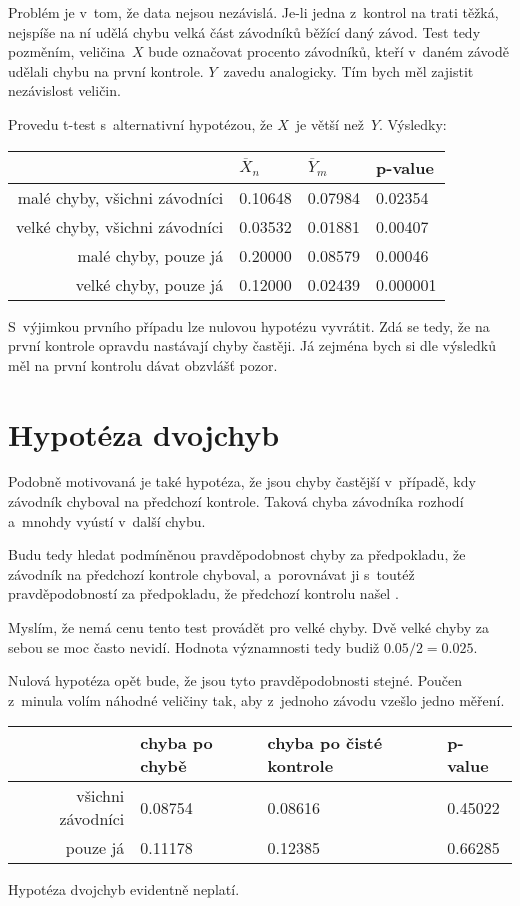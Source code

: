 \documentclass[a4paper,11pt]{article}
\begin{document}
Problém je v~tom, že data nejsou nezávislá. Je-li jedna z~kontrol na trati
těžká, nejspíše na ní udělá chybu velká část závodníků běžící daný závod. Test
tedy pozměním, veličina~$X$ bude označovat procento závodníků, kteří v~daném
závodě udělali chybu na první kontrole. $Y$~zavedu analogicky. Tím bych měl
zajistit nezávislost veličin.

Provedu t-test s~alternativní hypotézou, že $X$~je větší než~$Y$. Výsledky:

\begin{tabular}{r | l | l | l}
     & $\overline{X}_n$ & $\overline{Y}_m$ & p-value  \\
    \hline
    malé chyby, všichni závodníci  & 0.10648 & 0.07984 & 0.02354  \\
    velké chyby, všichni závodníci & 0.03532 & 0.01881 & 0.00407  \\
    malé chyby, pouze já           & 0.20000 & 0.08579 & 0.00046  \\
    velké chyby, pouze já          & 0.12000 & 0.02439 & 0.000001 \\
\end{tabular}

S~výjimkou prvního případu lze nulovou hypotézu vyvrátit. Zdá se tedy, že na
první kontrole opravdu nastávají chyby častěji. Já zejména bych si dle výsledků
měl na první kontrolu dávat obzvlášť pozor.

\section*{Hypotéza dvojchyb}

Podobně motivovaná je také hypotéza, že jsou chyby častější v~případě, kdy
závodník chyboval na předchozí kontrole. Taková chyba závodníka rozhodí a~mnohdy
vyústí v~další chybu.

Budu tedy hledat podmíněnou pravděpodobnost chyby za předpokladu, že závodník na
předchozí kontrole chyboval, a~porovnávat ji s~toutéž pravděpodobností za
předpokladu, že předchozí kontrolu našel .

Myslím, že nemá cenu tento test provádět pro velké chyby. Dvě velké chyby za
sebou se moc často nevidí. Hodnota významnosti tedy budiž $0.05 / 2 = 0.025$.

Nulová hypotéza opět bude, že jsou tyto pravděpodobnosti stejné. Poučen z~minula
volím náhodné veličiny tak, aby z~jednoho závodu vzešlo jedno měření.

\begin{tabular}{r | l | l | l}
    & chyba po chybě & chyba po čisté kontrole & p-value \\
   \hline
   všichni závodníci  & 0.08754 & 0.08616 & 0.45022 \\
   pouze já           & 0.11178 & 0.12385 & 0.66285 \\
\end{tabular}

Hypotéza dvojchyb evidentně neplatí.
\end{document}
